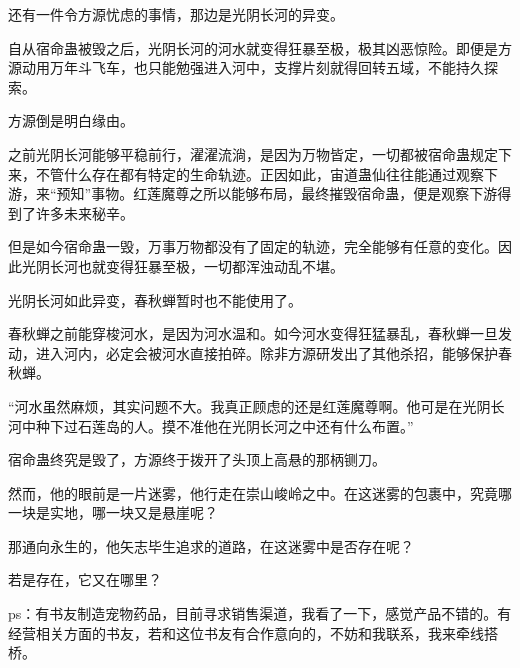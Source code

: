 \begin{this_body}
还有一件令方源忧虑的事情，那边是光阴长河的异变。

自从宿命蛊被毁之后，光阴长河的河水就变得狂暴至极，极其凶恶惊险。即便是方源动用万年斗飞车，也只能勉强进入河中，支撑片刻就得回转五域，不能持久探索。

方源倒是明白缘由。

之前光阴长河能够平稳前行，濯濯流淌，是因为万物皆定，一切都被宿命蛊规定下来，不管什么存在都有特定的生命轨迹。正因如此，宙道蛊仙往往能通过观察下游，来“预知”事物。红莲魔尊之所以能够布局，最终摧毁宿命蛊，便是观察下游得到了许多未来秘辛。

但是如今宿命蛊一毁，万事万物都没有了固定的轨迹，完全能够有任意的变化。因此光阴长河也就变得狂暴至极，一切都浑浊动乱不堪。

光阴长河如此异变，春秋蝉暂时也不能使用了。

春秋蝉之前能穿梭河水，是因为河水温和。如今河水变得狂猛暴乱，春秋蝉一旦发动，进入河内，必定会被河水直接拍碎。除非方源研发出了其他杀招，能够保护春秋蝉。

“河水虽然麻烦，其实问题不大。我真正顾虑的还是红莲魔尊啊。他可是在光阴长河中种下过石莲岛的人。摸不准他在光阴长河之中还有什么布置。”

宿命蛊终究是毁了，方源终于拨开了头顶上高悬的那柄铡刀。

然而，他的眼前是一片迷雾，他行走在崇山峻岭之中。在这迷雾的包裹中，究竟哪一块是实地，哪一块又是悬崖呢？

那通向永生的，他矢志毕生追求的道路，在这迷雾中是否存在呢？

若是存在，它又在哪里？

ps：有书友制造宠物药品，目前寻求销售渠道，我看了一下，感觉产品不错的。有经营相关方面的书友，若和这位书友有合作意向的，不妨和我联系，我来牵线搭桥。

\end{this_body}

